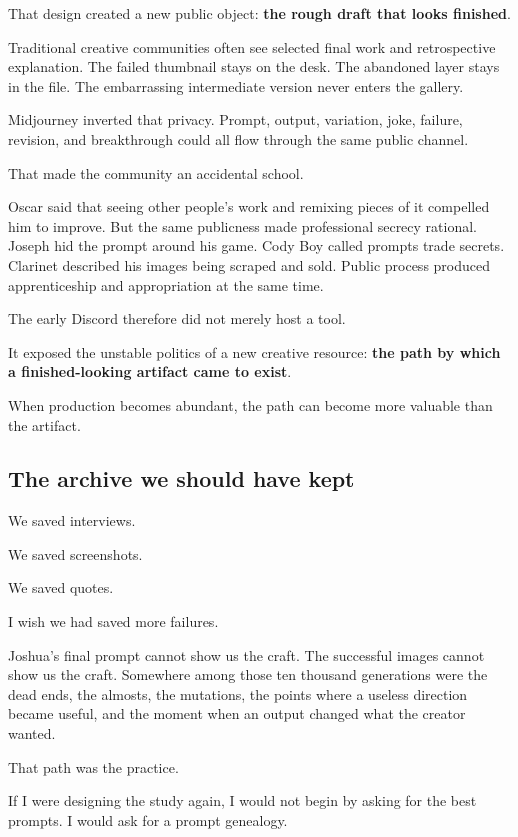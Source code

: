 \documentclass[
]{article}
\begin{document}
That design created a new public object: \textbf{the rough draft that
looks finished}.

Traditional creative communities often see selected final work and
retrospective explanation. The failed thumbnail stays on the desk. The
abandoned layer stays in the file. The embarrassing intermediate version
never enters the gallery.

Midjourney inverted that privacy. Prompt, output, variation, joke,
failure, revision, and breakthrough could all flow through the same
public channel.

That made the community an accidental school.

Oscar said that seeing other people's work and remixing pieces of it
compelled him to improve. But the same publicness made professional
secrecy rational. Joseph hid the prompt around his game. Cody Boy called
prompts trade secrets. Clarinet described his images being scraped and
sold. Public process produced apprenticeship and appropriation at the
same time.

The early Discord therefore did not merely host a tool.

It exposed the unstable politics of a new creative resource: \textbf{the
path by which a finished-looking artifact came to exist}.

When production becomes abundant, the path can become more valuable than
the artifact.

\subsection{The archive we should have
kept}\label{the-archive-we-should-have-kept}

We saved interviews.

We saved screenshots.

We saved quotes.

I wish we had saved more failures.

Joshua's final prompt cannot show us the craft. The successful images
cannot show us the craft. Somewhere among those ten thousand generations
were the dead ends, the almosts, the mutations, the points where a
useless direction became useful, and the moment when an output changed
what the creator wanted.

That path was the practice.

If I were designing the study again, I would not begin by asking for the
best prompts. I would ask for a prompt genealogy.
\end{document}
